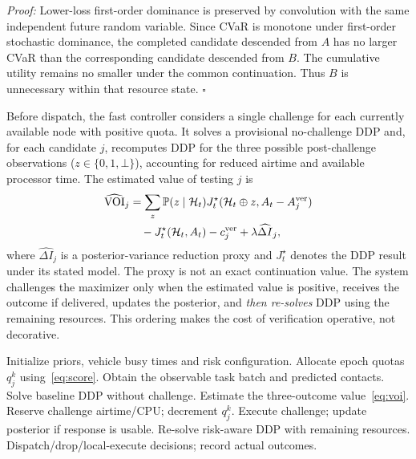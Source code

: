 \documentclass[journal]{IEEEtran}
\newcommand{\Prob}{\mathbb P}
\newcommand{\HH}{\mathcal H}
\begin{document}
\emph{Proof:} Lower-loss first-order dominance is preserved by convolution with the same independent future random variable. Since CVaR is monotone under first-order stochastic dominance, the completed candidate descended from $A$ has no larger CVaR than the corresponding candidate descended from $B$. The cumulative utility remains no smaller under the common continuation. Thus $B$ is unnecessary within that resource state. $\square$

Before dispatch, the fast controller considers a single challenge for each currently available node with positive quota. It solves a provisional no-challenge DDP and, for each candidate $j$, recomputes DDP for the three possible post-challenge observations ($z\in\{0,1,\bot\}$), accounting for reduced airtime and available processor time. The estimated value of testing $j$ is
\begin{align}\label{eq:voi}
 \widehat{\mathrm{VOI}}_j&=\sum_z\Prob(z\mid\HH_t)J_t^\star(\HH_t\oplus z,
 A_t-A_j^{\rm ver})\nonumber\\
 &\quad-J_t^\star(\HH_t,A_t)-c_j^{\rm ver}
 +\lambda\widehat{\Delta I}_j,
\end{align}
where $\widehat{\Delta I}_j$ is a posterior-variance reduction proxy and $J_t^\star$ denotes the DDP result under its stated model. The proxy is not an exact continuation value. The system challenges the maximizer only when the estimated value is positive, receives the outcome if delivered, updates the posterior, and \emph{then re-solves} DDP using the remaining resources. This ordering makes the cost of verification operative, not decorative.

\begin{algorithm}[t]
\caption{VA-RTO: periodic quotas and per-slot challenge-aware DDP}
\label{alg:varto}
\begin{algorithmic}[1]
\STATE Initialize priors, vehicle busy times and risk configuration.
   \STATE Allocate epoch quotas $q_j^k$ using~\eqref{eq:score}.
 \ENDIF
 \STATE Obtain the observable task batch and predicted contacts.
 \STATE Solve baseline DDP without challenge.
   \STATE Estimate the three-outcome value~\eqref{eq:voi}.
 \ENDFOR
    \STATE Reserve challenge airtime/CPU; decrement $q_j^k$.
    \STATE Execute challenge; update posterior if response is usable.
 \ENDIF
 \STATE Re-solve risk-aware DDP with remaining resources.
 \STATE Dispatch/drop/local-execute decisions; record actual outcomes.
\ENDFOR
\end{algorithmic}
\end{algorithm}
\end{document}
